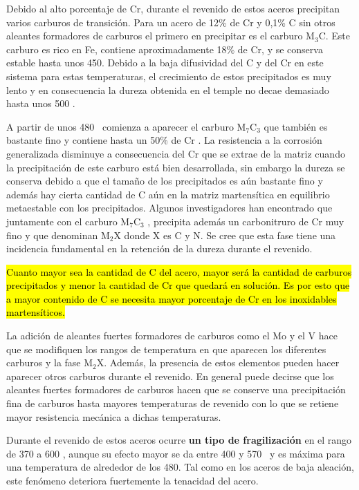 Debido al alto porcentaje de Cr, durante el revenido de estos aceros precipitan varios carburos de transición. Para un acero de 12\% de Cr y 0,1\% C sin otros aleantes formadores de carburos el primero en precipitar es el carburo M$_3$C. Este carburo es rico en Fe, contiene aproximadamente 18\% de Cr, y se conserva estable hasta unos 450\grad. Debido a la baja difusividad del C y del Cr en este sistema para estas temperaturas, el crecimiento de estos precipitados es muy lento y en consecuencia la dureza obtenida en el temple no decae demasiado hasta unos 500 \grad.


A partir de unos 480\grad~ comienza a aparecer el carburo M$_7$C$_3$ que también es bastante fino y contiene hasta un 50\% de Cr . La resistencia a la corrosión generalizada disminuye a consecuencia del Cr que se extrae de la matriz cuando la precipitación de este carburo está bien desarrollada, sin embargo la dureza se conserva debido a que el tamaño de los precipitados es aún bastante fino y además hay cierta cantidad de C aún en la matriz martensítica en equilibrio metaestable con los precipitados. Algunos investigadores han encontrado que juntamente con el carburo M$_7$C$_3$ , precipita además un carbonitruro de Cr muy fino y que denominan M$_2$X donde X es C y N. Se cree que esta fase tiene una incidencia fundamental en la retención de la dureza durante el revenido.

\hl{Cuanto mayor sea la cantidad de C del acero, mayor será la cantidad de carburos precipitados y menor la cantidad de Cr que quedará en solución. Es por esto que a mayor contenido de C se necesita mayor porcentaje de Cr en los inoxidables martensíticos.}

La adición de aleantes fuertes formadores de carburos como el Mo y el V hace que se modifiquen los rangos de temperatura en que aparecen los diferentes carburos y la fase M$_2$X. Además, la presencia de estos elementos pueden hacer aparecer otros carburos durante el revenido. En general puede decirse que los aleantes fuertes formadores de carburos hacen que se conserve una precipitación fina de carburos hasta mayores temperaturas de revenido con lo que se retiene mayor resistencia mecánica a dichas temperaturas.


Durante el revenido de estos aceros ocurre \textbf{un tipo de fragilización} en el rango de 370 a 600 \grad, aunque su efecto mayor se da entre 400 y 570\grad~ y es máxima para una temperatura de alrededor de los 480\grad. Tal como en los aceros de baja aleación, este fenómeno deteriora fuertemente la tenacidad del acero. 

